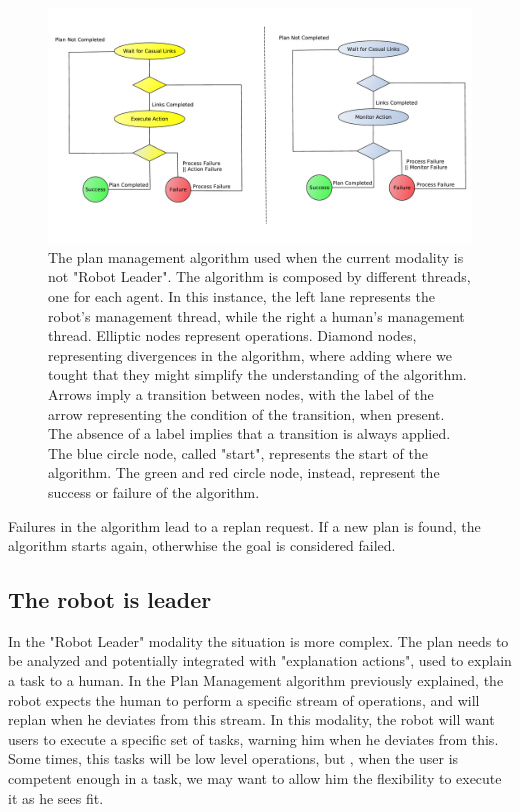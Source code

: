 \begin{figure}[ht!]
 \centering
 \includegraphics[]{img/plan_management/manage_plan_not_leader.pdf}
 \caption{The plan management algorithm used when the current modality is not "Robot Leader". The algorithm is composed by different threads, one for each agent. In this instance, the left lane represents the robot's management thread, while the right a human's management thread. Elliptic nodes represent operations. Diamond nodes, representing divergences in the algorithm, where adding where we tought that they might simplify the understanding of the algorithm. Arrows imply a transition between nodes, with the label of the arrow representing the condition of the transition, when present. The absence of a label implies that a transition is always applied. The blue circle node, called "start", represents the start of the algorithm. The green and red circle node, instead, represent the success or failure of the algorithm.}
 \label{fig:plan_management-manage_plan_not_leader}
 \end{figure}

Failures in the algorithm lead to a replan request. If a new plan is found, the algorithm starts again, otherwhise the goal is considered failed.

\subsection{The robot is leader}

In the "Robot Leader" modality the situation is more complex. The plan needs to be analyzed and potentially integrated with "explanation actions", used to explain a task to a human. In the Plan Management algorithm previously explained, the robot expects the human to perform a specific stream of operations, and will replan when he deviates from this stream. In this modality, the robot will want users to execute a specific set of tasks, warning him when he deviates from this. Some times, this tasks will be low level operations, but , when the user is competent enough in a task,  we may want to allow him the flexibility to execute it as he sees fit. 

